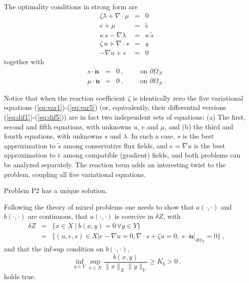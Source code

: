 \documentclass{article}
\begin{document}
\bigskip

The optimality conditions in strong form are
\begin{eqnarray}
\zeta \lambda  + \nabla \cdot \mu & = & 0 \label{eq:dif1}\\
 e + \mu & = & \tilde{e} \label{eq:dif2}\\
\kappa\, s - \nabla \lambda & = & \kappa\,\tilde{s} \label{eq:dif3}\\
 \zeta\,u+\nabla \cdot s  & = & q \label{eq:dif4}\\
-\nabla u + e &=&0 \label{eq:dif5}
\end{eqnarray}
together with
\begin{eqnarray}
 s \cdot \mathbf{\check{n}} & = & 0~,\qquad \mbox{ on } \partial \Omega_N \\
\mu\cdot\mathbf{\check{n}} & = & 0~,\qquad \mbox{ on } \partial \Omega_N ~.
\end{eqnarray}

\bigskip

 Notice that when the reaction coefficient $\zeta$ is identically zero the five variational equations (\ref{eq:var1})-(\ref{eq:var5})  (or, equivalently, their differential versions (\ref{eq:dif1})-(\ref{eq:dif5})) are in fact two independent sets of equations: (a) The first, second and fifth equations, with unknowns $u$, $e$ and $\mu$, and (b) the third and fourth equations, with unknowns $s$ and $\lambda$. In such a case, $s$ is the best approximation to $\tilde{s}$ among conservative flux fields, and $e=\nabla u$ is the best approximation to $\tilde{e}$ among compatible (gradient) fields, and both problems can be analyzed separately. The reaction term adds an interesting twist to the problem,  coupling all five variational equations.

\bigskip


 Problem P2 has a unique solution.

\bigskip

 Following the theory of mixed problems \cite{brezzifortin,ernguermond} one needs to show that $a(\cdot,\cdot)$ and $b(\cdot,\cdot)$ are continuous, that $a(\cdot,\cdot)$ is coercive in $\delta Z$, with
\begin{eqnarray}
\delta Z&=&\{x\in X~|~b(x,y)=0\,\forall y\in Y\}\nonumber \\
&=&\{(u,e,s)\in X|e-\nabla u=0, \nabla \cdot s + \zeta u =0,~\left. s\cdot \mathbf{\check{n}}\right |_{\partial\Omega_N} = 0  \}~,
\end{eqnarray}
and that the inf-sup condition on $b(\cdot,\cdot)$,
\begin{equation}
\inf_{y\in Y}\sup_{x\in X} \frac{b(x,y)}{\|x\|_X\|y\|_Y} \geq K_b > 0~.
\end{equation}
holds true.
\end{document}
